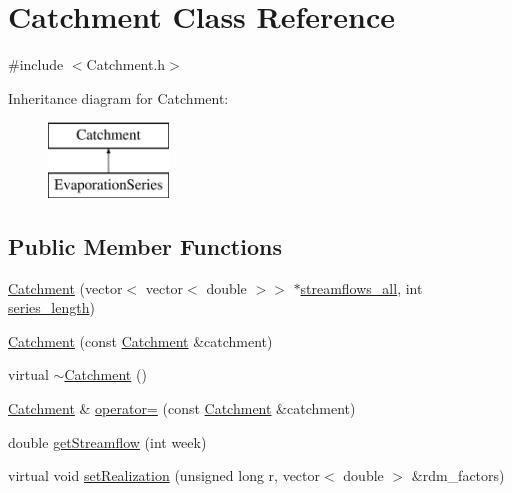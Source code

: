 \hypertarget{classCatchment}{}\section{Catchment Class Reference}
\label{classCatchment}


{\ttfamily \#include $<$Catchment.\+h$>$}

Inheritance diagram for Catchment\+:\begin{figure}[H]
\begin{center}
\leavevmode
\includegraphics[height=2.000000cm]{classCatchment}
\end{center}
\end{figure}
\subsection*{Public Member Functions}
\begin{DoxyCompactItemize}
\item 
\mbox{\hyperlink{classCatchment_aafdee6ee868a8892314672abb119e60f}{Catchment}} (vector$<$ vector$<$ double $>$$>$ $\ast$\mbox{\hyperlink{classCatchment_a579ccda86831f286c19c76354e7125c3}{streamflows\+\_\+all}}, int \mbox{\hyperlink{classCatchment_a2d4994220f63b876348b4ce4892bc6d3}{series\+\_\+length}})
\item 
\mbox{\hyperlink{classCatchment_ae311c4b2d857a8b5abc01f5317b04df2}{Catchment}} (const \mbox{\hyperlink{classCatchment}{Catchment}} \&catchment)
\item 
virtual \mbox{\hyperlink{classCatchment_a7c8073fc1dd2e2fa9fa8bfc68ce120bd}{$\sim$\+Catchment}} ()
\item 
\mbox{\hyperlink{classCatchment}{Catchment}} \& \mbox{\hyperlink{classCatchment_a66d0f20f34893ea2df589e5cbce31fc4}{operator=}} (const \mbox{\hyperlink{classCatchment}{Catchment}} \&catchment)
\item 
double \mbox{\hyperlink{classCatchment_af4e8206ffab5c901e5e4cdd6136f73a1}{get\+Streamflow}} (int week)
\item 
virtual void \mbox{\hyperlink{classCatchment_affb9042c5854a76efd864ce87d7d1877}{set\+Realization}} (unsigned long r, vector$<$ double $>$ \&rdm\+\_\+factors)
\end{DoxyCompactItemize}
